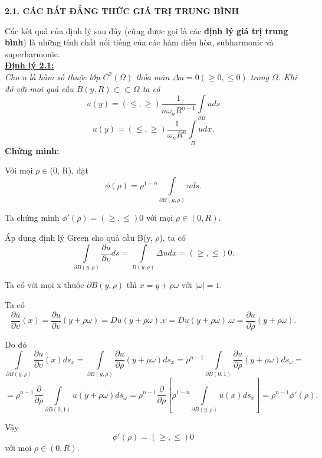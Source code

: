 \begin{center}
\textbf{2.1. CÁC BẤT ĐẲNG THỨC GIÁ TRỊ TRUNG BÌNH}
\end{center}

Các kết quả của định lý sau đây (cũng được gọi là các \textbf{định lý giá trị trung bình}) là những tính chất nổi tiếng của các hàm điều hòa, subharmonic và superharmonic.\\
\textbf{\underline{Định lý 2.1:}}
\\
\textit{Cho u là hàm số thuộc lớp  $C^2 (\Omega )$ thỏa mãn $\Delta u = 0( \ge 0,\le 0)$ trong $\Omega$. Khi đó với mọi quả cầu $ B(y,R) \subset  \subset \Omega $ 
ta có \[
u(y) = ( \le , \ge )\frac{1}{{n\omega _n R^{n - 1} }}\int\limits_{\partial B} u ds
\]
 \[
u(y) = ( \le , \ge )\frac{1}{{\omega _n R^{n } }}\int\limits_{B} u dx .
\]}
\textbf{Chứng minh:}

Với mọi $\rho\in$(0, R), đặt \[
 \phi (\rho) = \rho ^{1 - n} \int\limits_{\partial B(y,\rho )} {uds} .
\]

Ta chứng minh $
\phi '(\rho ) = (\ge , \le)0
$ với mọi $\rho \in (0, R)$.

Áp dụng định lý Green cho quả cầu B(y, $\rho$), ta có \[
\int\limits_{\partial B(y,\rho )} {\frac{{\partial u}}{{\partial \upsilon }}ds}  = \int\limits_{B(y,\rho )} {\Delta udx = ( \ge , \le )0} .
\]

Ta có với mọi x thuộc $\partial B(y, \rho)$ thì $x = y + \rho \omega$ với $|\omega | = 1$.

Ta có \[
\frac{{\partial u}}{{\partial \upsilon }}(x) = \frac{{\partial u}}{{\partial \upsilon }}(y + \rho \omega ) = Du(y + \rho \omega ).\upsilon  = Du(y + \rho \omega ).\omega  = \frac{{\partial u}}{{\partial \rho }}(y + \rho \omega ).
\]

Do đó
\[\int\limits_{\partial B(y,\rho )} {\frac{{\partial u}}{{\partial \upsilon }}} (x)ds_x = \int\limits_{\partial B(y,\rho )} {\frac{{\partial u}}{{\partial \rho }}} (y + \rho \omega )ds_x = \rho ^{n - 1} \int\limits_{\partial B(0,1)} {\frac{{\partial u}}{{\partial \rho }}} (y + \rho \omega )ds_\omega =\]
\[= \rho ^{n - 1} \frac{\partial }{{\partial \rho }}\int\limits_{\partial B(0,1)} u (y + \rho \omega )ds_\omega
= \rho ^{n - 1} \frac{\partial }{{\partial \rho }}\left[ {\rho ^{1 - n} \int\limits_{\partial B(y,\rho )} u (x)ds_x } \right] 
= \rho ^{n - 1} \phi '(\rho ).\]

Vậy 
\begin{equation}
\phi '(\rho ) = (\ge , \le)0
\end{equation}
với mọi $\rho \in (0, R)$.

